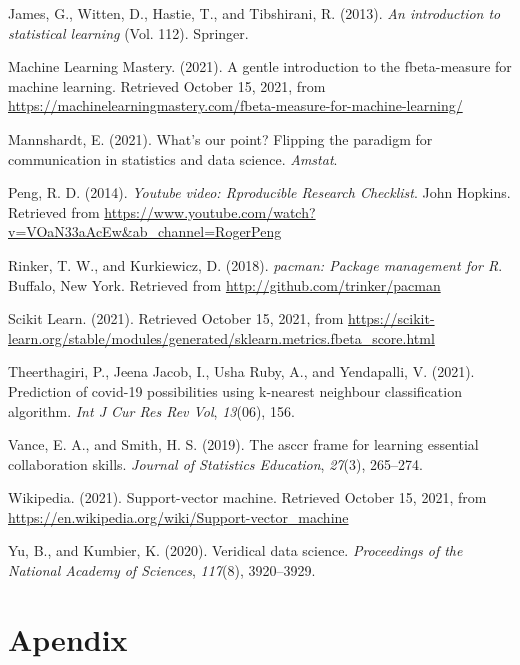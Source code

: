 \documentclass[
  10pt,
]{article}
\begin{document}
\leavevmode\hypertarget{ref-james2013introduction}{}%
James, G., Witten, D., Hastie, T., and Tibshirani, R. (2013). \emph{An introduction to statistical learning} (Vol. 112). Springer.

\leavevmode\hypertarget{ref-MLM}{}%
Machine Learning Mastery. (2021). A gentle introduction to the fbeta-measure for machine learning. Retrieved October 15, 2021, from \url{https://machinelearningmastery.com/fbeta-measure-for-machine-learning/}

\leavevmode\hypertarget{ref-elizabeth_flip}{}%
Mannshardt, E. (2021). What's our point? Flipping the paradigm for communication in statistics and data science. \emph{Amstat}.

\leavevmode\hypertarget{ref-peng}{}%
Peng, R. D. (2014). \emph{Youtube video: Rproducible Research Checklist}. John Hopkins. Retrieved from \url{https://www.youtube.com/watch?v=VOaN33aAcEw\&ab_channel=RogerPeng}

\leavevmode\hypertarget{ref-pacman}{}%
Rinker, T. W., and Kurkiewicz, D. (2018). \emph{pacman: Package management for R}. Buffalo, New York. Retrieved from \url{http://github.com/trinker/pacman}

\leavevmode\hypertarget{ref-scikit_learn}{}%
Scikit Learn. (2021). Retrieved October 15, 2021, from \url{https://scikit-learn.org/stable/modules/generated/sklearn.metrics.fbeta_score.html}

\leavevmode\hypertarget{ref-theerthagiri2021prediction}{}%
Theerthagiri, P., Jeena Jacob, I., Usha Ruby, A., and Yendapalli, V. (2021). Prediction of covid-19 possibilities using k-nearest neighbour classification algorithm. \emph{Int J Cur Res Rev\textbar{} Vol}, \emph{13}(06), 156.

\leavevmode\hypertarget{ref-vance2019asccr}{}%
Vance, E. A., and Smith, H. S. (2019). The asccr frame for learning essential collaboration skills. \emph{Journal of Statistics Education}, \emph{27}(3), 265--274.

\leavevmode\hypertarget{ref-wikipedia}{}%
Wikipedia. (2021). Support-vector machine. Retrieved October 15, 2021, from \url{https://en.wikipedia.org/wiki/Support-vector_machine}

\leavevmode\hypertarget{ref-yu2020veridical}{}%
Yu, B., and Kumbier, K. (2020). Veridical data science. \emph{Proceedings of the National Academy of Sciences}, \emph{117}(8), 3920--3929.

\newpage

\hypertarget{apendix}{%
\section*{Apendix}\label{apendix}}
\end{document}
